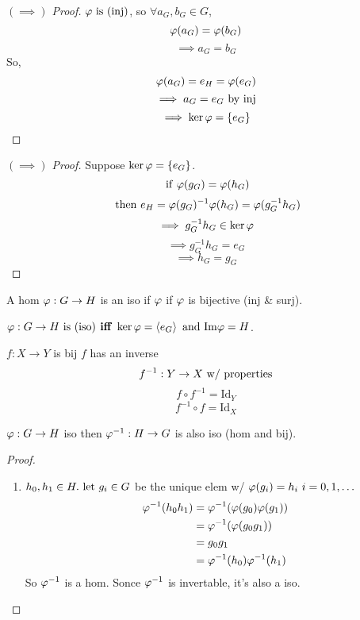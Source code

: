 \documentclass[12pt]{article}
\newcommand{\id}[1][]{\mathrm{Id}}
\newcommand\im{\TR{Im}}
\begin{document}
\bboxproof
\begin{proof}[\((\implies)\) Proof]
    \(\varphi\ \mathrm{is}\ (\mathrm{inj})\), so \(\forall a_G,b_G\in G\),
    \[
        \varphi(a_G)=\varphi(b_G)
    \]
    \[
        \implies a_G=b_G
    \]
    So,
    \[
        \varphi(a_G)=e_H=\varphi(e_G)
    \]
    \[
        \implies a_G=e_G\text{ by inj}
    \]
    \[
        \implies \ker\varphi = \{e_G\}
    \]
\end{proof}
\ebox

\bboxproof
\begin{proof}[\((\implies)\) Proof]
    Suppose \(\ker\varphi=\{e_G\}\). 
    \[
        \ \mathrm{if}\ \varphi(g_G)=\varphi(h_G)
    \]
    \[
        \ \mathrm{then}\  e_H = \varphi(g_G)^{-1}\varphi(h_G)=\varphi(g_G^{-1}h_G)
    \]
    \[
        \implies g_G^{-1}h_G\in\ker\varphi
    \]
    \[
        \implies g^{-1}_Gh_G=e_G
    \]
    \[
        \implies h_G=g_G
    \]
\end{proof}
\ebox

A hom \(\varphi:G\to H\) is an iso if \(\varphi\) if
\(\varphi\) is bijective (inj \& surj).

\bboxcoro
\begin{coro}[Isomorphic]
    \(\vphi:G\to H\is\TM{iso}\TB{ iff }
    \ker\vphi=\gen{e_G}\T{ and }
    \im\vphi=H\).
\end{coro}
\ebox

\bboxnote
\begin{note}
    \(f:X\to Y\) is bij  \(f\) has an inverse
    \[
        f^{-1}:Y \to X \text{ w/ properties}
    \]
    \[
        f\circ f^{-1}=\id_Y
    \]
    \[
        f^{-1}\circ f=\id_X
    \]
\end{note}
\ebox

\bboxprop
\begin{prop}
    \(\varphi:G\to H\) iso then \(\varphi^{-1}:H\to G\) is also iso (hom and bij).
\end{prop}
\ebox


\bboxproof
\begin{proof}\
    \begin{enumerate}
        \item \(h_0,h_1\in H.\ \mathrm{let}\  g_i\in G\) be the unique elem
            w/ \(\vphi(g_i)=h_i\ i=0,1,\dots\)
            \begin{align*}
                \varphi^{-1}(h_0h_1)
                &=\varphi^{-1}(\varphi(g_0)\varphi(g_1))\\
                &=\varphi^{-1}(\varphi(g_0g_1))\\
                &=g_0g_1\\
                &=\varphi^{-1}(h_0)\varphi^{-1}(h_1)
            \end{align*}
            So \(\varphi^{-1}\) is a hom. Sonce \(\varphi^{-1}\) is invertable,
            it's also a iso.
    \end{enumerate}
\end{proof}
\ebox
\end{document}
